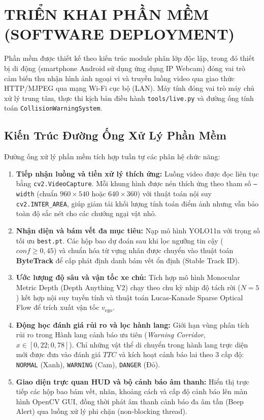 \section{TRIỂN KHAI PHẦN MỀM (SOFTWARE DEPLOYMENT)}
\label{sec:trien_khai_phan_mem}

Phần mềm được thiết kế theo kiến trúc module phân lớp độc lập, trong đó thiết bị di động (smartphone Android sử dụng ứng dụng IP Webcam) đóng vai trò cảm biến thu nhận hình ảnh ngoại vi và truyền luồng video qua giao thức HTTP/MJPEG qua mạng Wi-Fi cục bộ (LAN). Máy tính đóng vai trò máy chủ xử lý trung tâm, thực thi kịch bản điều hành \texttt{tools/live.py} và đường ống tính toán \texttt{CollisionWarningSystem}.

\subsection{Kiến Trúc Đường Ống Xử Lý Phần Mềm}
\label{subsec:software_pipeline}

Đường ống xử lý phần mềm tích hợp tuần tự các phân hệ chức năng:
\begin{enumerate}
    \item \textbf{Tiếp nhận luồng và tiền xử lý thích ứng:} Luồng video được đọc liên tục bằng \texttt{cv2.VideoCapture}. Mỗi khung hình được nén thích ứng theo tham số \texttt{--width} (chuẩn $960 \times 540$ hoặc $640 \times 360$) với thuật toán nội suy \texttt{cv2.INTER\_AREA}, giúp giảm tải khối lượng tính toán điểm ảnh nhưng vẫn bảo toàn độ sắc nét cho các chướng ngại vật nhỏ.
    \item \textbf{Nhận diện và bám vết đa mục tiêu:} Nạp mô hình YOLO11n với trọng số tối ưu \texttt{best.pt}. Các hộp bao dự đoán sau khi lọc ngưỡng tin cậy ($conf \ge 0,45$) và chuẩn hóa từ vựng nhãn được chuyển vào thuật toán \textbf{ByteTrack} để cấp phát định danh bám vết ổn định (Stable Track ID).
    \item \textbf{Ước lượng độ sâu và vận tốc xe chủ:} Tích hợp mô hình Monocular Metric Depth (Depth Anything V2) chạy theo chu kỳ nhịp độ tách rời ($N=5$) kết hợp nội suy tuyến tính và thuật toán Lucas-Kanade Sparse Optical Flow để trích xuất vận tốc $v_{\text{ego}}$.
    \item \textbf{Động học đánh giá rủi ro và lọc hành lang:} Giới hạn vùng phân tích rủi ro trong Hành lang cảnh báo ưu tiên (\textit{Warning Corridor}, $x \in [0,22; 0,78]$). Chỉ những vật thể di chuyển trong hành lang trực diện mới được đưa vào đánh giá $TTC$ và kích hoạt cảnh báo lai theo 3 cấp độ: \texttt{NORMAL} (Xanh), \texttt{WARNING} (Cam), \texttt{DANGER} (Đỏ).
    \item \textbf{Giao diện trực quan HUD và bộ cảnh báo âm thanh:} Hiển thị trực tiếp các hộp bao bám vết, nhãn, khoảng cách và cấp độ cảnh báo lên màn hình OpenCV GUI, đồng thời phát âm thanh cảnh báo đa âm tần (Beep Alert) qua luồng xử lý phi chặn (non-blocking thread).
\end{enumerate}

